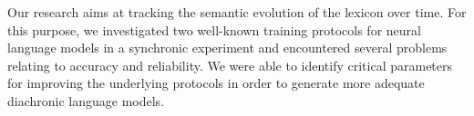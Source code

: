 Our research aims at tracking the semantic evolution of the lexicon over time. For this purpose, we investigated two well-known training protocols for neural language models in a synchronic experiment and encountered several problems relating to accuracy and reliability. We were able to identify critical parameters for improving the underlying protocols in order to generate more adequate diachronic language models.
